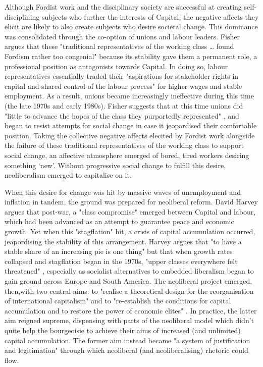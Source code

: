 Although Fordist work and the disciplinary society are successful at creating self-disciplining subjects who further the interests of Capital, the negative affects they elicit are likely to also create subjects who desire societal change. This dominance was consolidated through the co-option of unions and labour leaders. Fisher argues that these "traditional representatives of the working class \ldots{} found Fordism rather too congenial" \citeyearpar[p. 38]{fisher_capitalist_2009} because its stability gave them a permanent role, a professional position as antagonists towards Capital. In doing so, labour representatives essentially traded their "aspirations for stakeholder rights in capital and shared control of the labour process"   \citep[p. 37]{antonio_new_2000} for higher wages and stable employment. As a result, unions became increasingly ineffective during this time (the late 1970s and early 1980s). Fisher suggests that at this time unions did "little to advance the hopes of the class they purportedly represented" \citep[p. 38]{fisher_capitalist_2009}, and began to resist attempts for social change in case it jeopardised their comfortable position. Taking the collective negative affects elecited by Fordist work alongside the failure of these traditional representatives of the working class to support social change, an affective atmosphere emerged of bored, tired workers desiring something `new'. Without progressive social change to fulfill this desire, neoliberalism emerged to capitalise on it.

When this desire for change was hit by massive waves of unemployment and inflation in tandem, the ground was prepared for neoliberal reform.  David Harvey argues that post-war, a "class compromise" \citeyearpar[p. 10]{harvey_brief_2007} emerged between Capital and labour, which had been advanced as an attempt to guarantee peace and economic growth. Yet when this "stagflation" \citeyearpar[p. 12]{harvey_brief_2007} hit, a crisis of capital accumulation occurred, jeapordising the stability of this arrangement. Harvey argues that "to have a stable share of an increasing pie is one thing" but that when growth rates collapsed and stagflation began in the 1970s, "upper classes everywhere felt threatened" \citeyearpar[p. 39]{harvey_brief_2007}, especially as socialist alternatives to embedded liberalism began to gain ground across Europe and South America. The neoliberal project emerged, then,with two central aims: to "realise a theoretical design for the reorganisation of international capitalism" and to "re-establish the conditions for capital accumulation and to restore the power of economic elites" \citeyearpar[p. 45]{harvey_brief_2007}. In practice, the latter aim reigned supreme, dispensing with parts of the neoliberal model which didn't quite help the bourgeoisie to achieve their aims of increased (and unlimited) capital accumulation. The former aim instead became "a system of justification and legitimation" \citeyearpar[p. 19]{harvey_brief_2007} through which neoliberal (and neoliberalising) rhetoric could flow.

